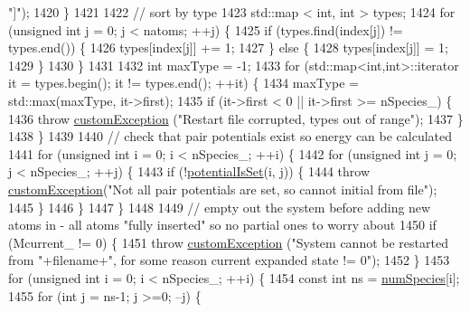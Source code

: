 \begin{DoxyCode}
{      "]"});
1420     \}
1421 
1422     \textcolor{comment}{// sort by type}
1423     std::map < int, int > types;
1424     \textcolor{keywordflow}{for} (\textcolor{keywordtype}{unsigned} \textcolor{keywordtype}{int} j = 0; j < natoms; ++j) \{
1425         \textcolor{keywordflow}{if} (types.find(index[j]) != types.end()) \{
1426             types[index[j]] += 1;
1427         \} \textcolor{keywordflow}{else} \{
1428             types[index[j]] = 1;
1429         \}
1430     \}
1431 
1432     \textcolor{keywordtype}{int} maxType = -1;
1433     \textcolor{keywordflow}{for} (std::map<int,int>::iterator it = types.begin(); it != types.end(); ++it) \{
1434         maxType = std::max(maxType, it->first);
1435         \textcolor{keywordflow}{if} (it->first < 0 || it->first >= nSpecies\_) \{
1436             \textcolor{keywordflow}{throw} \hyperlink{classcustom_exception}{customException} (\textcolor{stringliteral}{"Restart file corrupted, types out of range"});
1437         \}
1438     \}
1439 
1440     \textcolor{comment}{// check that pair potentials exist so energy can be calculated}
1441     \textcolor{keywordflow}{for} (\textcolor{keywordtype}{unsigned} \textcolor{keywordtype}{int} i = 0; i < nSpecies\_; ++i) \{
1442         \textcolor{keywordflow}{for} (\textcolor{keywordtype}{unsigned} \textcolor{keywordtype}{int} j = 0; j < nSpecies\_; ++j) \{
1443             \textcolor{keywordflow}{if} (!\hyperlink{classsim_system_a40af191fae6091e26413ee06ae188ae9}{potentialIsSet}(i, j)) \{
1444                 \textcolor{keywordflow}{throw} \hyperlink{classcustom_exception}{customException}(\textcolor{stringliteral}{"Not all pair potentials are set, so cannot initial
       from file"});
1445             \}
1446         \}
1447     \}
1448 
1449     \textcolor{comment}{// empty out the system before adding new atoms in - all atoms "fully inserted" so no partial ones to
       worry about}
1450     \textcolor{keywordflow}{if} (Mcurrent\_ != 0) \{
1451         \textcolor{keywordflow}{throw} \hyperlink{classcustom_exception}{customException} (\textcolor{stringliteral}{"System cannot be restarted from "}+filename+\textcolor{stringliteral}{", for some
       reason current expanded state != 0"});
1452     \}
1453     \textcolor{keywordflow}{for} (\textcolor{keywordtype}{unsigned} \textcolor{keywordtype}{int} i = 0; i < nSpecies\_; ++i) \{
1454         \textcolor{keyword}{const} \textcolor{keywordtype}{int} ns = \hyperlink{classsim_system_a9eea865e6dc1cff377b1e79c4d9c23f0}{numSpecies}[i];
1455         \textcolor{keywordflow}{for} (\textcolor{keywordtype}{int} j = ns-1; j >=0; --j) \{

\end{DoxyCode}
